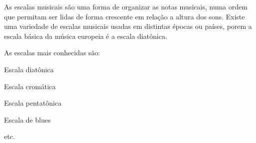 \label{sec:pos:Escala}
As escalas musicais são uma forma de organizar as notas musicais, 
numa ordem que permitam ser lidas de forma crescente em relação a altura dos sons.
Existe uma variedade de escalas musicais usadas em distintas épocas ou países, 
porem a escala básica da música europeia é a escala diatônica. \cite[pp. 753]{apel1969harvard}
\begin{example}As escalas mais conhecidas são:
\begin{inparaitem}
\item Escala diatônica
\item Escala cromática
\item Escala pentatônica
\item Escala de blues
\item etc.
\end{inparaitem}
\end{example}

